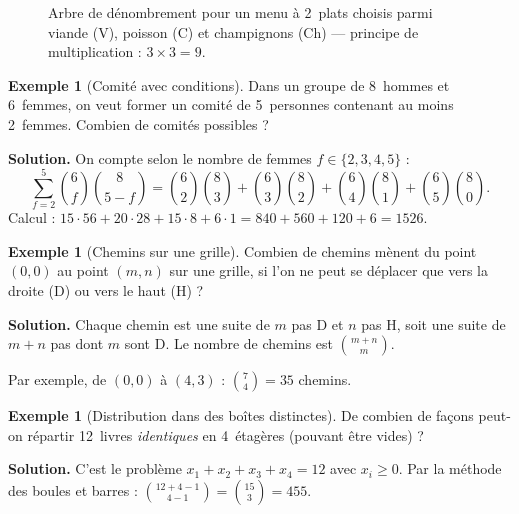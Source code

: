 \documentclass[12pt,a4paper,openany]{book}
\theoremstyle{definition}
\newtheorem{exemple}[definition]{Exemple}
\theoremstyle{plain}
\theoremstyle{remark}
\begin{document}
\begin{figure}[ht]
\centering
{}
\caption{Arbre de dénombrement pour un menu à 2~plats choisis parmi viande (V),
poisson (C) et champignons (Ch) --- principe de multiplication : $3 \times 3 = 9$.}
\label{fig:arbre-comptage}
\end{figure}

\begin{exemple}[Comité avec conditions]\label{ex:comite}
Dans un groupe de 8~hommes et 6~femmes, on veut former un comité de
5~personnes contenant au moins 2~femmes. Combien de comités possibles ?

\textbf{Solution.} On compte selon le nombre de femmes $f \in \{2,3,4,5\}$ :
\[
  \sum_{f=2}^{5} \binom{6}{f}\binom{8}{5-f}
  = \binom{6}{2}\binom{8}{3} + \binom{6}{3}\binom{8}{2}
  + \binom{6}{4}\binom{8}{1} + \binom{6}{5}\binom{8}{0}.
\]
Calcul :
$15 \cdot 56 + 20 \cdot 28 + 15 \cdot 8 + 6 \cdot 1
= 840 + 560 + 120 + 6 = 1526$.
\end{exemple}

\begin{exemple}[Chemins sur une grille]\label{ex:chemins-grille}
Combien de chemins mènent du point $(0,0)$ au point $(m,n)$ sur une grille,
si l'on ne peut se déplacer que vers la droite (D) ou vers le haut (H) ?

\textbf{Solution.} Chaque chemin est une suite de $m$ pas D et $n$ pas H,
soit une suite de $m+n$ pas dont $m$ sont D. Le nombre de chemins est
$\binom{m+n}{m}$.

Par exemple, de $(0,0)$ à $(4,3)$ : $\binom{7}{4} = 35$ chemins.
\end{exemple}

\begin{exemple}[Distribution dans des boîtes distinctes]\label{ex:distribution}
De combien de façons peut-on répartir 12~livres \emph{identiques} en
4~étagères (pouvant être vides) ?

\textbf{Solution.} C'est le problème $x_1 + x_2 + x_3 + x_4 = 12$ avec
$x_i \geq 0$. Par la méthode des boules et barres :
$\binom{12+4-1}{4-1} = \binom{15}{3} = 455$.
\end{exemple}
\end{document}
